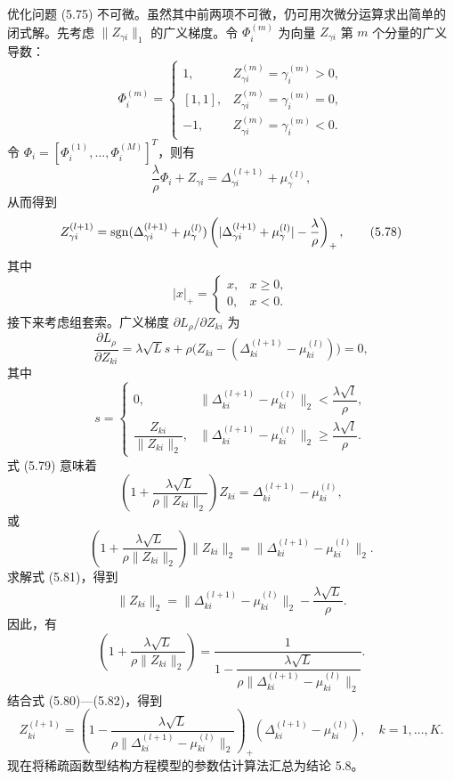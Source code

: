 优化问题 (5.75) 不可微。虽然其中前两项不可微，仍可用次微分运算求出简单的闭式解。先考虑 $\lVert Z_{\gamma i}\rVert_1$ 的广义梯度。令 $\Phi_i^{(m)}$ 为向量 $Z_{\gamma i}$ 第 $m$ 个分量的广义导数：
\[
\Phi_i^{(m)}=\begin{cases}
1,&Z_{\gamma i}^{(m)}=\gamma_i^{(m)}>0,\\
[1,1],&Z_{\gamma i}^{(m)}=\gamma_i^{(m)}=0,\\
-1,&Z_{\gamma i}^{(m)}=\gamma_i^{(m)}<0.
\end{cases}
\]
令 $\Phi_i=[\Phi_i^{(1)},\ldots,\Phi_i^{(M)}]^T$，则有
\[
\frac\lambda\rho\Phi_i+Z_{\gamma i}=\Delta_{\gamma i}^{(l+1)}+\mu_\gamma^{(l)},
\]
从而得到
\begin{equation}
Z_{\gamma i}^{(l+1)}
=\operatorname{sgn}(\Delta_{\gamma i}^{(l+1)}+\mu_\gamma^{(l)})
\left(|\Delta_{\gamma i}^{(l+1)}+\mu_\gamma^{(l)}|-\frac\lambda\rho\right)_+,
\tag{5.78}
\end{equation}
其中
\[
|x|_+=\begin{cases}x,&x\geq0,\\0,&x<0.\end{cases}
\]
接下来考虑组套索。广义梯度 $\partial L_\rho/\partial Z_{ki}$ 为
\begin{equation}
\frac{\partial L_\rho}{\partial Z_{ki}}
=\lambda\sqrt Ls+\rho\bigl(Z_{ki}-(\Delta_{ki}^{(l+1)}-\mu_{ki}^{(l)})\bigr)=0,
\tag{5.79}
\end{equation}
其中
\[
s=\begin{cases}
0,&\lVert\Delta_{ki}^{(l+1)}-\mu_{ki}^{(l)}\rVert_2<\dfrac{\lambda\sqrt l}{\rho},\\[7pt]
\dfrac{Z_{ki}}{\lVert Z_{ki}\rVert_2},
&\lVert\Delta_{ki}^{(l+1)}-\mu_{ki}^{(l)}\rVert_2\geq\dfrac{\lambda\sqrt l}{\rho}.
\end{cases}
\]
式 (5.79) 意味着
\begin{equation}
\left(1+\frac{\lambda\sqrt L}{\rho\lVert Z_{ki}\rVert_2}\right)Z_{ki}
=\Delta_{ki}^{(l+1)}-\mu_{ki}^{(l)},
\tag{5.80}
\end{equation}
或
\begin{equation}
\left(1+\frac{\lambda\sqrt L}{\rho\lVert Z_{ki}\rVert_2}\right)\lVert Z_{ki}\rVert_2
=\lVert\Delta_{ki}^{(l+1)}-\mu_{ki}^{(l)}\rVert_2.
\tag{5.81}
\end{equation}
求解式 (5.81)，得到
\[
\lVert Z_{ki}\rVert_2=\lVert\Delta_{ki}^{(l+1)}-\mu_{ki}^{(l)}\rVert_2-\frac{\lambda\sqrt L}{\rho}.
\]
因此，有
\begin{equation}
\left(1+\frac{\lambda\sqrt L}{\rho\lVert Z_{ki}\rVert_2}\right)
=\frac1{1-\dfrac{\lambda\sqrt L}{\rho\lVert\Delta_{ki}^{(l+1)}-\mu_{ki}^{(l)}\rVert_2}}.
\tag{5.82}
\end{equation}
结合式 (5.80)—(5.82)，得到
\begin{equation}
Z_{ki}^{(l+1)}
=\left(1-\frac{\lambda\sqrt L}{\rho\lVert\Delta_{ki}^{(l+1)}-\mu_{ki}^{(l)}\rVert_2}\right)_+
(\Delta_{ki}^{(l+1)}-\mu_{ki}^{(l)}),\quad k=1,\ldots,K.
\tag{5.83}
\end{equation}
现在将稀疏函数型结构方程模型的参数估计算法汇总为结论 5.8。

